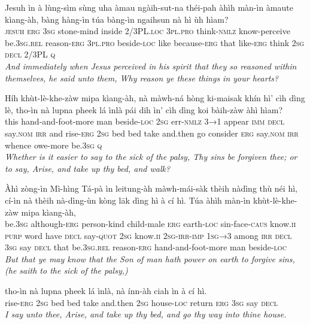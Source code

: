 \documentclass[11pt,a4paper]{article}
\begin{document}
\begin{exe}
\gll Jesuh ìn à lùng-sìm sùng uha àmau ngàih-sut-na théi-pah àhìh màn-ìn àmaute kìang-àh, bàng hàng-ìn túa bàng-ìn ngaihsun nà hì ùh hìam? \\
     \textsc{jesuh} \textsc{erg} \textsc{3sg} stone-mind inside 2/3PL.\textsc{loc} \textsc{3pl}.\textsc{pro} think-\textsc{nmlz} know-perceive be.\textsc{3sg}.\textsc{rel} reason-\textsc{erg} \textsc{3pl}.\textsc{pro} beside-\textsc{loc} like because-\textsc{erg} that like-\textsc{erg} think \textsc{2sg} \textsc{decl} 2/3PL \textsc{q} \\
\glt \textcolor{kjvcolor}{\textit{And immediately when Jesus perceived in his spirit that they so reasoned within themselves, he said unto them, Why reason ye these things in your hearts?}}

\gll Híh khùt-lè-khe-zàw mipa kìang-àh, nà màwh-ná hòng ki-maisak khín hì' cìh dìng lè, tho-ìn nà lupna pheek lá ìnlà pái dih ìn' cìh dìng koi bàih-zàw àhì hìam? \\
     this hand-and-foot-more man beside-\textsc{loc} \textsc{2sg} err-\textsc{nmlz} \textsc{3→1} appear \textsc{imm} \textsc{decl} say.\textsc{nom} \textsc{irr} and rise-\textsc{erg} \textsc{2sg} bed bed take and.then go consider \textsc{erg} say.\textsc{nom} \textsc{irr} whence owe-more be.\textsc{3sg} \textsc{q} \\
\glt \textcolor{kjvcolor}{\textit{Whether is it easier to say to the sick of the palsy, Thy sins be forgiven thee; or to say, Arise, and take up thy bed, and walk?}}

\gll Àhì zòng-ìn Mì-hìng Tá-pà ìn leitung-àh màwh-mái-sàk thèih nàdìng thù néi hì, cí-ìn nà thèih nà-dìng-ùn kòng lāk dìng hì à cí hì. Túa àhìh màn-ìn khùt-lè-khe-zàw mipa kìang-àh, \\
     be.\textsc{3sg} although-\textsc{erg} person-kind child-male \textsc{erg} earth-\textsc{loc} sin-face-\textsc{caus} know.\textsc{ii} \textsc{purp} word have \textsc{decl} say-\textsc{quot} \textsc{2sg} know.\textsc{ii} \textsc{2sg}-\textsc{irr}-\textsc{imp} \textsc{1sg→3} among \textsc{irr} \textsc{decl} \textsc{3sg} say \textsc{decl} that be.\textsc{3sg}.\textsc{rel} reason-\textsc{erg} hand-and-foot-more man beside-\textsc{loc} \\
\glt \textcolor{kjvcolor}{\textit{But that ye may know that the Son of man hath power on earth to forgive sins, (he saith to the sick of the palsy,)}}

\gll tho-ìn nà lupna pheek lá ìnlà, nà ínn-àh ciah ìn à cí hì. \\
     rise-\textsc{erg} \textsc{2sg} bed bed take and.then \textsc{2sg} house-\textsc{loc} return \textsc{erg} \textsc{3sg} say \textsc{decl} \\
\glt \textcolor{kjvcolor}{\textit{I say unto thee, Arise, and take up thy bed, and go thy way into thine house.}}


\end{exe}
\end{document}
